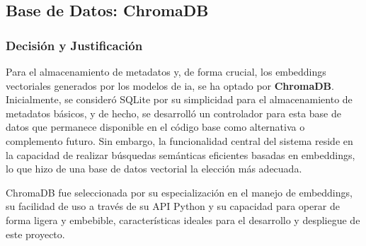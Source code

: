 \subsection{Base de Datos: ChromaDB}
\label{subsec:decision_chromadb}
\subsubsection{Decisión y Justificación}
Para el almacenamiento de metadatos y, de forma crucial, los embeddings vectoriales generados por los modelos de \gls{ia}, se ha optado por \textbf{ChromaDB}. Inicialmente, se consideró SQLite por su simplicidad para el almacenamiento de metadatos básicos, y de hecho, se desarrolló un controlador para esta base de datos que permanece disponible en el código base como alternativa o complemento futuro. Sin embargo, la funcionalidad central del sistema reside en la capacidad de realizar búsquedas semánticas eficientes basadas en embeddings, lo que hizo de una base de datos vectorial la elección más adecuada.

ChromaDB fue seleccionada por su especialización en el manejo de embeddings, su facilidad de uso a través de su API Python y su capacidad para operar de forma ligera y embebible, características ideales para el desarrollo y despliegue de este proyecto.


